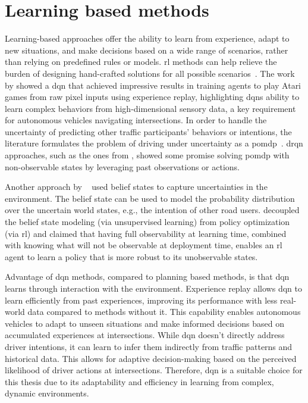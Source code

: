 \section{Learning based methods}
Learning-based approaches offer the ability to learn from experience, adapt to new situations, and make decisions based on a wide range of scenarios, rather than relying on predefined rules or models. \Gls{rl} methods can help relieve the burden of designing hand-crafted solutions for all possible scenarios~\cite{Sutton2018, Isele2018}. The work by \citet{Mnih2013} showed a \gls{dqn} that achieved impressive results in training agents to play Atari games from raw pixel inputs using experience replay, highlighting \gls{dqn}s ability to learn complex behaviors from high-dimensional sensory data, a key requirement for autonomous vehicles navigating intersections.  
In order to handle the uncertainty of predicting other traffic participants' behaviors or intentions, the literature formulates the problem of driving under uncertainty as a \gls{pomdp}~\cite{Kochenderfer2015}. \Gls{drqn} approaches, such as the ones from \citet{HausknechtS15drqn, zhu2018improving}, showed some promise solving \gls{pomdp} with non-observable states by leveraging past observations or actions. %

Another approach by ~\citet{Bouton2017} used belief states to capture uncertainties in the environment. The belief state can be used to model the probability distribution over the uncertain world states, e.g., the intention of other road users.  decoupled the belief state modeling (via unsupervised learning) from policy optimization (via \gls{rl}) and \citet{Littman1995} claimed that having full observability at learning time, combined with knowing what will not be observable at deployment time, enables an \gls{rl} agent to learn a policy that is more robust to its unobservable states. 

Advantage of \gls{dqn} methods, compared to planning based methods, is that \gls{dqn} learns through interaction with the environment. Experience replay allows \gls{dqn} to learn efficiently from past experiences, improving its performance with less real-world data compared to methods without it. This capability enables autonomous vehicles to adapt to unseen situations and make informed decisions based on accumulated experiences at intersections. While \gls{dqn} doesn't directly address driver intentions, it can learn to infer them indirectly from traffic patterns and historical data. This allows for adaptive decision-making based on the perceived likelihood of driver actions at intersections. Therefore, \gls{dqn} is a suitable choice for this thesis due to its adaptability and efficiency in learning from complex, dynamic environments.
